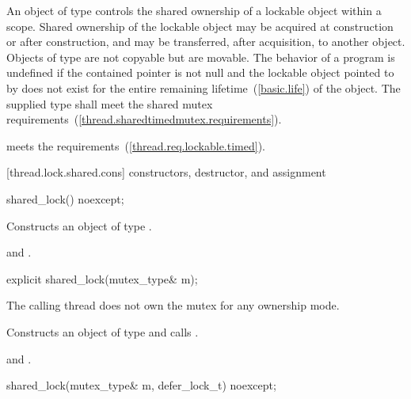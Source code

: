 \pnum
An object of type  controls the shared ownership of a
lockable object within a scope. Shared ownership of the lockable object may be
acquired at construction or after construction, and may be transferred, after
acquisition, to another  object. Objects of type
 are not copyable but are movable. The behavior of a program
is undefined if the contained pointer  is not null and the lockable
object pointed to by  does not exist for the entire remaining
lifetime~(\ref{basic.life}) of the  object. The supplied
 type shall meet the shared mutex
requirements~(\ref{thread.sharedtimedmutex.requirements}).

\pnum
\enternote {} meets the 
requirements~(\ref{thread.req.lockable.timed}). \exitnote

[thread.lock.shared.cons]{ constructors, destructor, and assignment}

%
\begin{itemdecl}
shared_lock() noexcept;
\end{itemdecl}

\begin{itemdescr}
\pnum
\effects Constructs an object of type .

\pnum
\postconditions {} and .
\end{itemdescr}

%
\begin{itemdecl}
explicit shared_lock(mutex_type& m);
\end{itemdecl}

\begin{itemdescr}
\pnum
\requires The calling thread does not own the mutex for any ownership mode.

\pnum
\effects Constructs an object of type  and calls .

\pnum
\postconditions {} and .
\end{itemdescr}

%
\begin{itemdecl}
shared_lock(mutex_type& m, defer_lock_t) noexcept;
\end{itemdecl}

